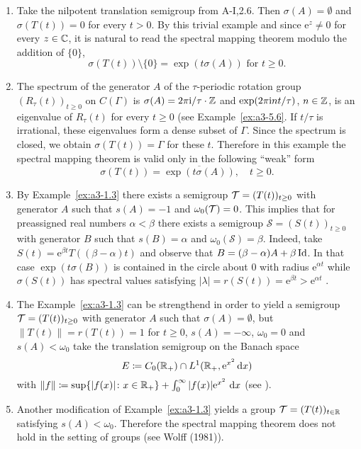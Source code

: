 \begin{example}\label{ex:a3-6.1}
\begin{enumerate}[\upshape (i), wide, labelsep=.5em]
\item
Take the nilpotent translation semigroup from A-I,2.6. Then $\sigma(A) = \emptyset$ and $\sigma(T(t)) = 0$ for every $t > 0$.
By this trivial example and since $\mathrm{e}^{z} \neq 0$ for every $z \in \mathbb{C}$, it is natural to read the spectral mapping theorem modulo the addition of $\{0\}$, \ie 
\[
\sigma(T(t)) \setminus \{0\} = \exp(t\sigma(A))  \text{ for } t \geq 0 .
\]
\item
The spectrum of the generator $A$ of the $\tau$-periodic rotation group $(R_{\tau}(t))_{t \geq 0}$ on $C(\Gamma)$ is $\sigma(A) = 2\pi\mathrm{i} /\tau\cdot\mathbb{Z}$ and $\exp(2\pi\mathrm{i} nt/\tau)$, $n \in \mathbb{Z}$, is an eigenvalue of $R_{\tau}(t)$ for every $t \geq 0$ (see Example~\ref{ex:a3-5.6}.
If $t/\tau$ is irrational, these eigenvalues form a dense subset of $\Gamma$.
Since the spectrum is closed, we obtain $\sigma(T(t)) = \Gamma$ for these $t$.
Therefore in this example the spectral mapping theorem is valid only in the following \enquote{weak} form
\[
\sigma(T(t)) = \overline{\exp(t\sigma(A))}, \quad t \geq 0 .
\]

\item 
By Example~\ref{ex:a3-1.3} there exists a semigroup $\mathcal{T} = (T(t))_{t \geq 0}$ with generator $A$ such that $s(A) = -1$ and $\omega_{0}(\mathcal{T}) = 0$.
This implies that for preassigned real numbers $\alpha < \beta$ there exists a semigroup $\mathcal{S} = (S(t))_{t \geq 0}$ with generator $B$ such that $s(B) = \alpha$ and $\omega_{0}(\mathcal{S}) = \beta$. Indeed, take $S(t) = \mathrm{e}^{\beta t}T((\beta - \alpha)t)$ and observe that $B = (\beta-\alpha)A + \beta\operatorname{Id}$. 
In that case $\exp(t\sigma(B))$ is contained in the circle about $0$ with radius $\mathrm{e}^{\alpha t}$ 
while $\sigma(S(t))$ has spectral values satisfying $|\lambda| = r(S(t)) = \mathrm{e}^{\beta t} > \mathrm{e}^{\alpha t}$ .


\item 
The Example~\ref{ex:a3-1.3} can be strengthend in order to yield a semigroup $\mathcal{T} = (T(t))_{t \geq 0}$ with generator $A$ such that $\sigma(A) = \emptyset$, but $\|T(t)\| = r(T(t)) = 1$ for $t \geq 0$, \ie $s(A) = -\infty$, $\omega_{0} = 0$ and $s(A) < \omega_{0}$ 
take the translation semigroup on the Banach space
\[
E \coloneqq C_{0}(\mathbb{R}_{+}) \cap L^{1}(\mathbb{R}_{+}, \mathrm{e}^{x^{2}}\mathop{}\!\mathrm{d}{x})
\]
with $\|f\| \coloneqq \sup \{|f(x)| \colon x \in \mathbb{R}_{+}\} + \int_{0}^{\infty} |f(x)|\mathrm{e}^{x^{2}} \, \mathop{}\!\mathrm{d}{x}$ (see \citet{greinervoigtwolff:1981}).

\item 
Another modification of Example~\ref{ex:a3-1.3} yields a group $\mathcal{T} = (T(t))_{t \in \mathbb{R}}$ satisfying $s(A) < \omega_{0}$.
Therefore the spectral mapping theorem does not hold in the setting of groups (see Wolff (1981)).
\end{enumerate}
\end{example}
